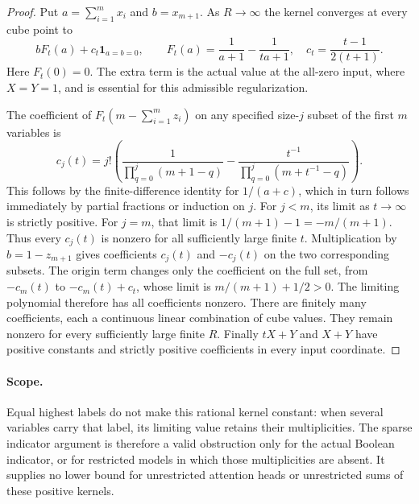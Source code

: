\documentclass[11pt]{article}
\begin{document}
\begin{proof}
Put $a=\sum_{i=1}^m x_i$ and $b=x_{m+1}$. As $R\to\infty$ the
kernel converges at every cube point to
\[
 b F_t(a)+c_t\boldsymbol1_{a=b=0},\qquad
 F_t(a)=\frac1{a+1}-\frac1{ta+1},\quad
 c_t=\frac{t-1}{2(t+1)}.
\]
Here $F_t(0)=0$. The extra term is the actual value at the all-zero
input, where $X=Y=1$, and is essential for this admissible
regularization.

The coefficient of $F_t(m-\sum_{i=1}^m z_i)$ on any specified
size-$j$ subset of the first $m$ variables is
\[
 c_j(t)=j!\left(
 \frac1{\prod_{q=0}^j(m+1-q)}
 -\frac{t^{-1}}{\prod_{q=0}^j(m+t^{-1}-q)}\right).
\]
This follows by the finite-difference identity for $1/(a+c)$,
which in turn follows immediately by partial fractions or induction
on $j$. For $j<m$, its limit as $t\to\infty$ is strictly positive.
For $j=m$, that limit is $1/(m+1)-1=-m/(m+1)$.
Thus every $c_j(t)$ is nonzero for all sufficiently large finite $t$.
Multiplication by $b=1-z_{m+1}$ gives coefficients $c_j(t)$ and
$-c_j(t)$ on the two corresponding subsets. The origin term changes
only the coefficient on the full set, from $-c_m(t)$ to
$-c_m(t)+c_t$, whose limit is $m/(m+1)+1/2>0$.
The limiting polynomial therefore has all coefficients nonzero.
There are finitely many coefficients, each a continuous linear
combination of cube values. They remain nonzero for every sufficiently
large finite $R$. Finally $tX+Y$ and $X+Y$ have positive constants
and strictly positive coefficients in every input coordinate.
\end{proof}

\paragraph{Scope.}
Equal highest labels do not make this rational kernel constant: when
several variables carry that label, its limiting value retains their
multiplicities. The sparse indicator argument is therefore a valid
obstruction only for the actual Boolean indicator, or for restricted
models in which those multiplicities are absent. It supplies no lower
bound for unrestricted attention heads or unrestricted sums of these
positive kernels.
\end{document}
